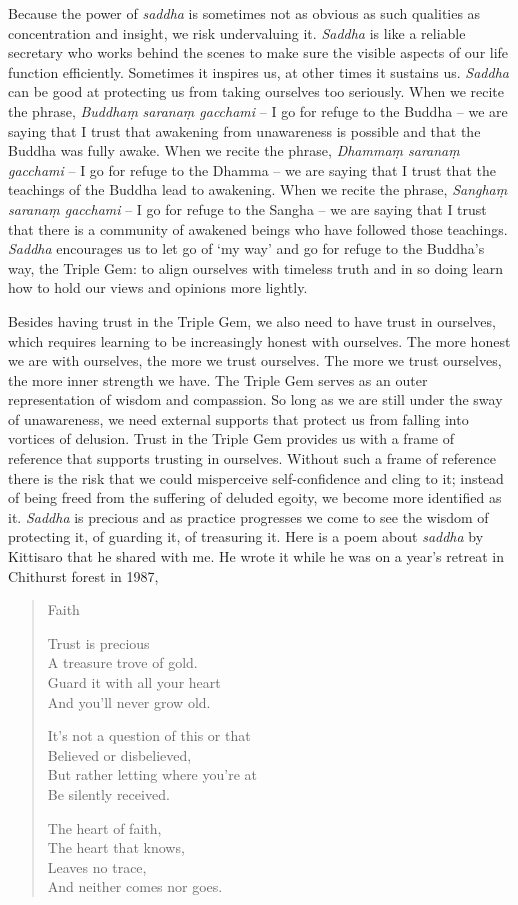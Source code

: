 Because the power of \emph{saddha} is sometimes not as obvious as such
qualities as concentration and insight, we risk undervaluing it.
\emph{Saddha} is like a reliable secretary who works behind the scenes
to make sure the visible aspects of our life function efficiently.
Sometimes it inspires us, at other times it sustains us. \emph{Saddha}
can be good at protecting us from taking ourselves too seriously. When
we recite the phrase, \emph{Buddhaṃ} \emph{saranaṃ gacchami} -- I go for
refuge to the Buddha -- we are saying that I trust that awakening from
unawareness is possible and that the Buddha was fully awake. When we
recite the phrase, \emph{Dhammaṃ saranaṃ gacchami} -- I go for refuge to
the Dhamma -- we are saying that I trust that the teachings of the
Buddha lead to awakening. When we recite the phrase, \emph{Sanghaṃ
saranaṃ gacchami} -- I go for refuge to the Sangha -- we are saying that
I trust that there is a community of awakened beings who have followed
those teachings. \emph{Saddha} encourages us to let go of `my way' and
go for refuge to the Buddha's way, the Triple Gem: to align ourselves
with timeless truth and in so doing learn how to hold our views and
opinions more lightly.

Besides having trust in the Triple Gem, we also need to have trust in
ourselves, which requires learning to be increasingly honest with
ourselves. The more honest we are with ourselves, the more we trust
ourselves. The more we trust ourselves, the more inner strength we have.
The Triple Gem serves as an outer representation of wisdom and
compassion. So long as we are still under the sway of unawareness, we
need external supports that protect us from falling into vortices of
delusion. Trust in the Triple Gem provides us with a frame of reference
that supports trusting in ourselves. Without such a frame of reference
there is the risk that we could misperceive self-confidence and cling to
it; instead of being freed from the suffering of deluded egoity, we
become more identified as it. \emph{Saddha} is precious and as practice
progresses we come to see the wisdom of protecting it, of guarding it,
of treasuring it. Here is a poem about \emph{saddha} by Kittisaro that
he shared with me. He wrote it while he was on a year's retreat in
Chithurst forest in 1987,

\begin{quote}
  Faith

  Trust is precious\\
  A treasure trove of gold.\\
  Guard it with all your heart\\
  And you'll never grow old.

  It's not a question of this or that\\
  Believed or disbelieved,\\
  But rather letting where you're at\\
  Be silently received.

  The heart of faith,\\
  The heart that knows,\\
  Leaves no trace,\\
  And neither comes nor goes.
\end{quote}

